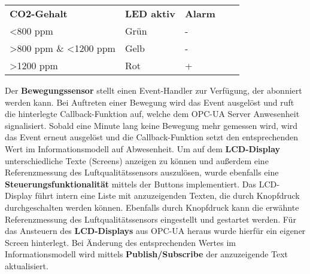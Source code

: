 \begin{table}[]
\centering
\begin{tabular}{|l|l|l|ll}
\cline{1-3}
\textbf{CO2-Gehalt}                        & \textbf{LED aktiv} & \textbf{Alarm} &  &  \\ \cline{1-3}
\textless 800 ppm                          & Grün               & -              &  &  \\ \cline{1-3}
\textgreater 800 ppm \& \textless 1200 ppm & Gelb               & -              &  &  \\ \cline{1-3}
\textgreater 1200 ppm                      & Rot                & +              &  &  \\ \cline{1-3}
\end{tabular}
\end{table}

\newline Der \textbf{Bewegungssensor} stellt einen Event-Handler zur Verfügung, der abonniert werden kann. Bei Auftreten einer Bewegung wird das Event ausgelöst und ruft die hinterlegte Callback-Funktion auf, welche dem OPC-UA Server Anwesenheit signalisiert. Sobald eine Minute lang keine Bewegung mehr gemessen wird, wird das Event erneut ausgelöst und die Callback-Funktion setzt den entsprechenden Wert im Informationsmodell auf Abwesenheit.
\newline Um auf dem \textbf{LCD-Display} unterschiedliche Texte (Screens) anzeigen zu können und außerdem eine Referenzmessung des Luftqualitätssensors auszulösen, wurde ebenfalls eine \textbf{Steuerungsfunktionalität} mittels der Buttons implementiert. Das LCD-Display führt intern eine Liste mit anzuzeigenden Texten, die durch Knopfdruck durchgeschalten werden können. Ebenfalls durch Knopfdruck kann die erwähnte Referenzmessung des Luftqualitätssensors eingestellt und gestartet werden.
\newline Für das Ansteuern des \textbf{LCD-Displays} aus OPC-UA heraus wurde hierfür ein eigener Screen hinterlegt. Bei Änderung des entsprechenden Wertes im Informationsmodell wird mittels \textbf{Publish/Subscribe} der anzuzeigende Text aktualisiert.
